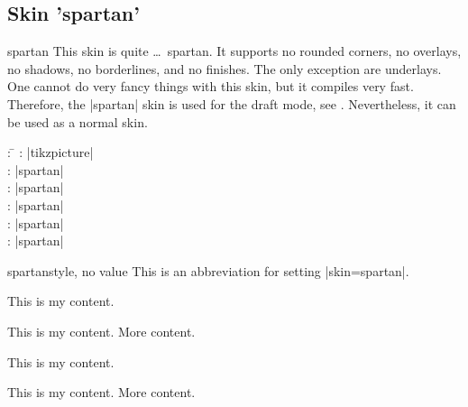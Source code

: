 \clearpage

\subsection{Skin 'spartan'}\label{subsec:spartan}

\begin{docSkin}{spartan}
  This skin is quite \ldots\ spartan.
  It supports no rounded corners, no overlays, no shadows, no borderlines,
  and no finishes. The only exception are underlays.
  One cannot do very fancy things with this skin, but it compiles very fast.
  Therefore, the |spartan| skin is
  used for the draft mode, see .
  Nevertheless, it can be used as a normal skin.

\begin{tcolorbox}[skintable=spartan]
  \begin{tabbing}
    : \=\kill
    :  \> |tikzpicture|\\ 
    :           \> |spartan|\\
    : \> |spartan|\\ 
    :        \> |spartan|\\
    :    \> |spartan|\\
    :           \> |spartan|
  \end{tabbing}
\end{tcolorbox}
\end{docSkin}


\begin{docTcbKey}{spartan}{}{style, no value}
  This is an abbreviation for setting |skin=spartan|.
\end{docTcbKey}


\begin{dispExample}
\begin{tcbraster}[spartan,raster equal height,raster columns=4,
    colback=LightGreen,colframe=DarkGreen,colbacktitle=LimeGreen!75!DarkGreen,
    left=1mm,right=1mm,top=1mm,bottom=1mm,middle=1mm]
  \begin{tcolorbox}
    This is my content.
  \end{tcolorbox}
  \begin{tcolorbox}
    This is my content.
    \tcblower
    More content.
  \end{tcolorbox}
  \begin{tcolorbox}[adjusted title=My title]
    This is my content.
  \end{tcolorbox}
  \begin{tcolorbox}[adjusted title=My title]
    This is my content.
    \tcblower
    More content.
  \end{tcolorbox}
\end{tcbraster}
\end{dispExample}


